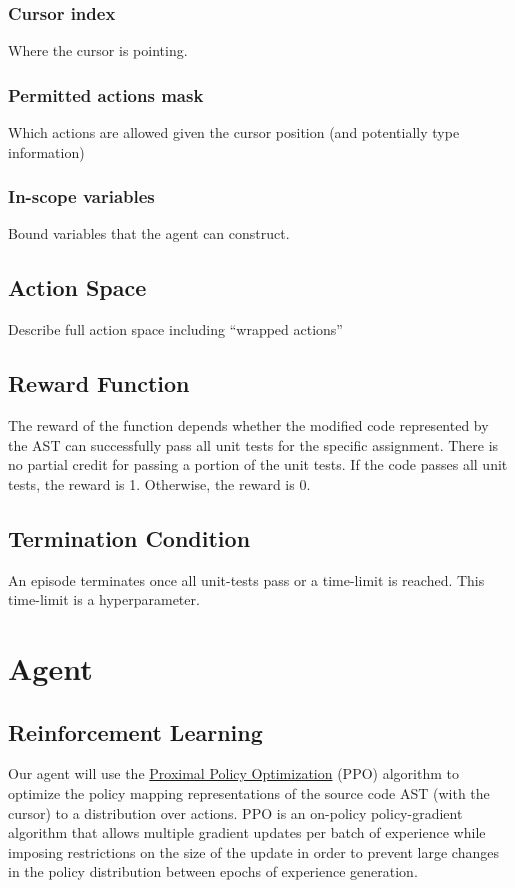 \documentclass{article}
\begin{document}
\subsubsection{Cursor index}
\hspace{16}Where the cursor is pointing.

\subsubsection{Permitted actions mask}
\hspace{16}Which actions are allowed given the cursor position (and potentially type information)

\subsubsection{In-scope variables}
\hspace{16}Bound variables that the agent can construct.

\subsection{Action Space}
\hspace{16}Describe full action space including “wrapped actions”

\subsection{Reward Function}
\hspace{16}The reward of the function depends whether the modified code represented by the AST can successfully pass all unit tests for the specific assignment. There is no partial credit for passing a portion of the unit tests. If the code passes all unit tests, the reward is 1. Otherwise, the reward is 0.

\subsection{Termination Condition}
\hspace{16}An episode terminates once all unit-tests pass or a time-limit is reached. This time-limit is a hyperparameter.

\section{Agent}
\subsection{Reinforcement Learning}
Our agent will use the \href{https://arxiv.org/abs/1707.06347}{Proximal Policy Optimization} (PPO) algorithm to optimize the policy mapping representations of the source code AST (with the cursor) to a distribution over actions. PPO is an on-policy policy-gradient algorithm that allows multiple gradient updates per batch of experience while imposing restrictions on the size of the update in order to prevent large changes in the policy distribution between epochs of experience generation.
\end{document}

